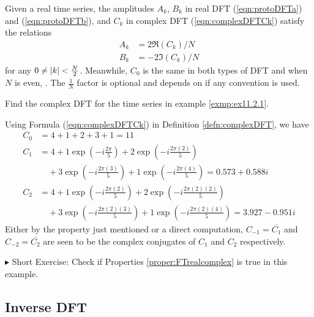 \begin{proper}
\label{proper:FTrealcomplex}
Given a real time series, the amplitudes $A_k$, $B_k$ in real DFT (\ref{eqn:protoDFTa}) and (\ref{eqn:protoDFTb}), and $C_k$ in complex DFT (\ref{eqn:complexDFTCk}) satisfy the relations
\begin{subequations}
\begin{align}
A_k &= 2\Re(C_k)/N \\
B_k &= -2\Im(C_k)/N
\end{align}    
\end{subequations}
for any $0 \neq \abs{k} < \frac{N}{2}$. Meanwhile, $C_0$ is the same in both types of DFT and when $N$ is even, . The $\frac{1}{N}$ factor is optional and depends on if any convention is used.
\end{proper}

\begin{exmp}
\label{exmp:ex11.2.2}
Find the complex DFT for the time series in example \ref{exmp:ex11.2.1}.
\end{exmp}
\begin{solution}
Using Formula (\ref{eqn:complexDFTCk}) in Definition \ref{defn:complexDFT}, we have
\begin{align*}
C_0 &= 4+1+2+3+1 = 11 \\
C_1 &= 4 + 1\exp(-i\frac{2\pi}{5}) + 2\exp(-i\frac{2\pi(2)}{5}) \\
&\quad+ 3\exp(-i\frac{2\pi(3)}{5}) + 1\exp(-i\frac{2\pi(4)}{5}) = 0.573 + 0.588i \\
C_2 &= 4 + 1\exp(-i\frac{2\pi(2)}{5}) + 2\exp(-i\frac{2\pi(2)(2)}{5}) \\
&\quad+ 3\exp(-i\frac{2\pi(2)(3)}{5}) + 1\exp(-i\frac{2\pi(2)(4)}{5}) = 3.927 - 0.951i
\end{align*}
Either by the property just mentioned or a direct computation, $C_{-1} = \overline{C_1}$ and $C_{-2} = \overline{C_2}$ are seen to be the complex conjugates of $C_1$ and $C_2$ respectively. 
\end{solution}
$\blacktriangleright$ Short Exercise: Check if Properties \ref{proper:FTrealcomplex} is true in this example.\footnotemark

\subsection{Inverse DFT}

